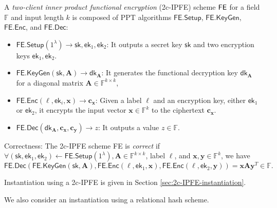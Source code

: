 \begin{definition}
\label{def:2c-IPFE}
	A \emph{two-client inner product functional encryption} (2c-IPFE) scheme $\sf FE$ for a field $\mathbb{F}$ and input length $k$ is composed of PPT algorithms $\textsf{FE.Setup}$, $\textsf{FE.KeyGen}$, $\textsf{FE.Enc}$, and $\textsf{FE.Dec}$:

	\begin{itemize}
	
		\item $\textsf{FE.Setup}(1^\lambda) \to \textsf{sk}, \textsf{ek}_1, \textsf{ek}_2$: It outputs a secret key $\textsf{sk}$ and two encryption keys $\textsf{ek}_1, \textsf{ek}_2$.
	
		\item $\textsf{FE.KeyGen}(\textsf{sk}, \mathbf{A}) \to \textsf{dk}_\mathbf{A}$: It generates the functional decryption key $\textsf{dk}_\mathbf{A}$ for a diagonal matrix $\mathbf{A} \in \mathbb{F}^{k \times k}$,  
	
		\item $\textsf{FE.Enc}(\ell, \textsf{ek}_i, \mathbf{x}) \to \mathbf{c_x}$: Given a label $\ell$ and an encryption key, either $\textsf{ek}_1$ or $\textsf{ek}_2$, it encrypts the input vector $\mathbf{x} \in \mathbb{F}^k$ to the ciphertext $\mathbf{c_x}$. 
	
		\item $\textsf{FE.Dec}(\textsf{dk}_\mathbf{A}, \mathbf{c_x}, \mathbf{c_y}) \to z$: It outputs a value $z \in \mathbb{F}$.
	
	\end{itemize}
	
	\noindent Correctness: The 2c-IPFE scheme \textsf{FE} is \emph{correct} if $\forall (\textsf{sk}, \textsf{ek}_1, \textsf{ek}_2) \gets \textsf{FE.Setup}(1^\lambda), \mathbf{A} \in \mathbb{F}^{k \times k}$, label $\ell$, and $ \mathbf{x}, \mathbf{y} \in \mathbb{F}^k$, we have
	\[
		\textsf{FE.Dec}(\textsf{FE.KeyGen}(\textsf{sk},  \mathbf{A}), \textsf{FE.Enc}(\ell, \textsf{ek}_1, \mathbf{x}), \textsf{FE.Enc}(\ell, \textsf{ek}_2, \mathbf{y}) ) = \mathbf{x} \mathbf{A} \mathbf{y}^T \in \mathbb{F}.
	\]

\end{definition}

Instantiation using a 2c-IPFE is given in Section \ref{sec:2c-IPFE-instantiation}.

We also consider an instantiation using a relational hash scheme.

